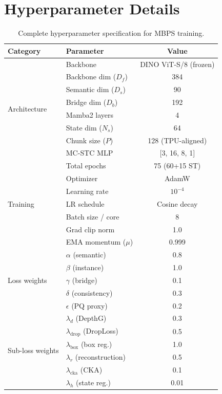 \documentclass[10pt,twocolumn,letterpaper]{article}
\begin{document}
\section{Hyperparameter Details}
\label{sec:supp_hyperparams}

\begin{table}[H]
\centering
\caption{Complete hyperparameter specification for MBPS training.}
\label{tab:hyperparams}
\setlength{\tabcolsep}{3pt}
\begin{tabular}{llc}
\toprule
Category & Parameter & Value \\
\midrule
\multirow{8}{*}{Architecture}
& Backbone & DINO ViT-S/8 (frozen) \\
& Backbone dim ($D_f$) & 384 \\
& Semantic dim ($D_s$) & 90 \\
& Bridge dim ($D_b$) & 192 \\
& Mamba2 layers & 4 \\
& State dim ($N_s$) & 64 \\
& Chunk size ($P$) & 128 (TPU-aligned) \\
& MC-STC MLP & [3, 16, 8, 1] \\
\midrule
\multirow{7}{*}{Training}
& Total epochs & 75 (60+15 ST) \\
& Optimizer & AdamW \\
& Learning rate & $10^{-4}$ \\
& LR schedule & Cosine decay \\
& Batch size / core & 8 \\
& Grad clip norm & 1.0 \\
& EMA momentum ($\mu$) & 0.999 \\
\midrule
\multirow{5}{*}{Loss weights}
& $\alpha$ (semantic) & 0.8 \\
& $\beta$ (instance) & 1.0 \\
& $\gamma$ (bridge) & 0.1 \\
& $\delta$ (consistency) & 0.3 \\
& $\epsilon$ (PQ proxy) & 0.2 \\
\midrule
\multirow{9}{*}{Sub-loss weights}
& $\lambda_d$ (DepthG) & 0.3 \\
& $\lambda_{\text{drop}}$ (DropLoss) & 0.5 \\
& $\lambda_{\text{box}}$ (box reg.) & 1.0 \\
& $\lambda_r$ (reconstruction) & 0.5 \\
& $\lambda_{\text{cka}}$ (CKA) & 0.1 \\
& $\lambda_h$ (state reg.) & 0.01 \\

\end{tabular}
\end{table}
\end{document}
